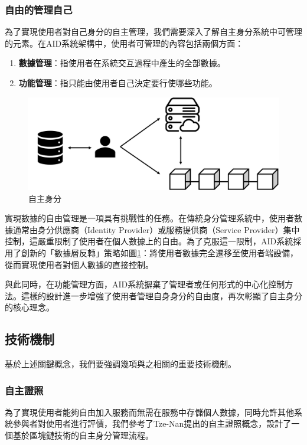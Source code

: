 \subsubsection{自由的管理自己}
為了實現使用者對自己身分的自主管理，我們需要深入了解自主身分系統中可管理的元素。在AID系統架構中，使用者可管理的內容包括兩個方面：
\begin{enumerate}
  \item \textbf{數據管理}：指使用者在系統交互過程中產生的全部數據。
  \item \textbf{功能管理}：指只能由使用者自己決定要行使哪些功能。
\end{enumerate}
\begin{figure}
  \centering
  \includegraphics[width=\linewidth,keepaspectratio]{figures/aid.png}
  \caption{自主身分}
  \label{fig:aid}
\end{figure}
實現數據的自由管理是一項具有挑戰性的任務。在傳統身分管理系統中，使用者數據通常由身分供應商（Identity Provider）或服務提供商（Service Provider）集中控制，這嚴重限制了使用者在個人數據上的自由。為了克服這一限制，AID系統採用了創新的「數據層反轉」策略如圖\ref{fig:aid}：將使用者數據完全遷移至使用者端設備，從而實現使用者對個人數據的直接控制。

與此同時，在功能管理方面，AID系統摒棄了管理者或任何形式的中心化控制方法。這樣的設計進一步增強了使用者管理自身身分的自由度，再次彰顯了自主身分的核心理念。
\subsection{技術機制}
基於上述關鍵概念，我們要強調幾項與之相關的重要技術機制。
\subsubsection{自主證照}
為了實現使用者能夠自由加入服務而無需在服務中存儲個人數據，同時允許其他系統參與者對使用者進行評價，我們參考了Tze-Nan\cite{NTU202102846}提出的自主證照概念，設計了一個基於區塊鏈技術的自主身分管理流程。

